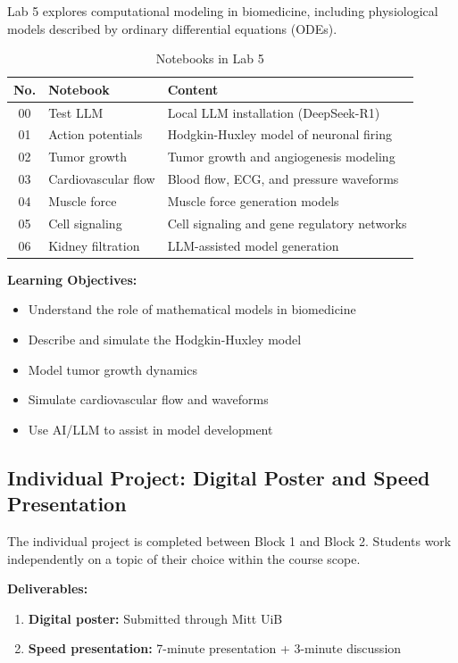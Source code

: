 \documentclass[11pt,a4paper]{article}
\begin{document}
Lab 5 explores computational modeling in biomedicine, including physiological models described by ordinary differential equations (ODEs).

\begin{table}[htbp]
\centering
\caption{Notebooks in Lab 5}
\label{tab:lab5}
\begin{tabular}{@{}clp{6.5cm}@{}}
\toprule
\textbf{No.} & \textbf{Notebook} & \textbf{Content} \\
\midrule
00 & Test LLM & Local LLM installation (DeepSeek-R1) \\
01 & Action potentials & Hodgkin-Huxley model of neuronal firing \\
02 & Tumor growth & Tumor growth and angiogenesis modeling \\
03 & Cardiovascular flow & Blood flow, ECG, and pressure waveforms \\
04 & Muscle force & Muscle force generation models \\
05 & Cell signaling & Cell signaling and gene regulatory networks \\
06 & Kidney filtration & LLM-assisted model generation \\
\bottomrule
\end{tabular}
\end{table}

\textbf{Learning Objectives:}
\begin{itemize}[nosep]
    \item Understand the role of mathematical models in biomedicine
    \item Describe and simulate the Hodgkin-Huxley model
    \item Model tumor growth dynamics
    \item Simulate cardiovascular flow and waveforms
    \item Use AI/LLM to assist in model development
\end{itemize}

\subsection{Individual Project: Digital Poster and Speed Presentation}

The individual project is completed between Block 1 and Block 2. Students work independently on a topic of their choice within the course scope.

\textbf{Deliverables:}
\begin{enumerate}[nosep]
    \item \textbf{Digital poster:} Submitted through Mitt UiB
    \item \textbf{Speed presentation:} 7-minute presentation + 3-minute discussion
\end{enumerate}
\end{document}
